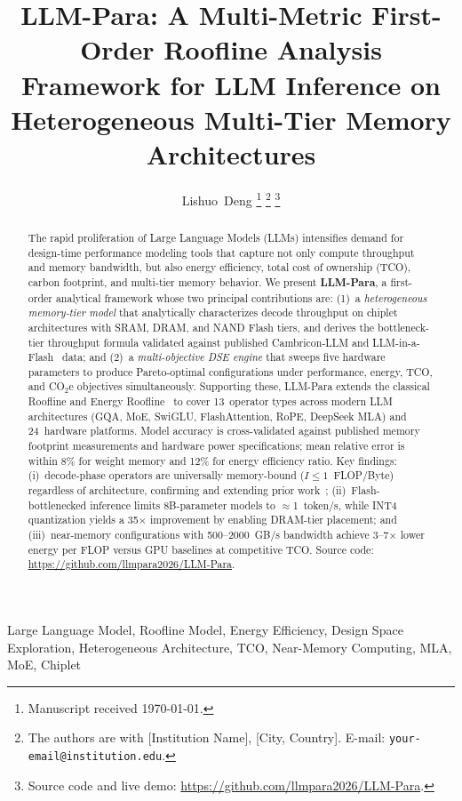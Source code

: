 \documentclass[journal]{IEEEtran}
\title{LLM-Para: A Multi-Metric First-Order Roofline Analysis Framework
       for LLM Inference on Heterogeneous Multi-Tier Memory Architectures}
\author{%
  Lishuo~Deng%
  \thanks{Manuscript received \today.}%
  \thanks{The authors are with [Institution Name], [City, Country].
          E-mail: \texttt{your-email@institution.edu}.}%
  \thanks{Source code and live demo:
          \url{https://github.com/llmpara2026/LLM-Para}.}%
}
\begin{document}
\maketitle

\begin{abstract}
The rapid proliferation of Large Language Models (LLMs) intensifies demand
for design-time performance modeling tools that capture not only compute
throughput and memory bandwidth, but also energy efficiency, total cost of
ownership (TCO), carbon footprint, and multi-tier memory behavior.
We present \textbf{LLM-Para}, a first-order analytical framework whose two
principal contributions are: (1)~a \emph{heterogeneous memory-tier model}
that analytically characterizes decode throughput on chiplet architectures
with SRAM, DRAM, and NAND Flash tiers, and derives the bottleneck-tier
throughput formula validated against published Cambricon-LLM and
LLM-in-a-Flash~\cite{llminaflash} data; and (2)~a \emph{multi-objective DSE engine} that sweeps
five hardware parameters to produce Pareto-optimal configurations under
performance, energy, TCO, and CO$_2$e objectives simultaneously.
Supporting these, LLM-Para extends the classical Roofline and Energy
Roofline~\cite{energyroofline} to cover 13~operator types across modern
LLM architectures (GQA, MoE, SwiGLU, FlashAttention, RoPE, DeepSeek MLA)
and 24~hardware platforms.
Model accuracy is cross-validated against published memory footprint
measurements and hardware power specifications; mean relative error is
within 8\% for weight memory and 12\% for energy efficiency ratio.
Key findings: (i)~decode-phase operators are universally memory-bound
($I\!\leq\!1$~FLOP/Byte) regardless of architecture, confirming and
extending prior work~\cite{llmviewer}; (ii)~Flash-bottlenecked inference
limits 8B-parameter models to $\approx$1~token/s, while INT4 quantization
yields a 35$\times$ improvement by enabling DRAM-tier placement; and
(iii)~near-memory configurations with 500--2000~GB/s bandwidth achieve
3--7$\times$ lower energy per FLOP versus GPU baselines at competitive TCO.
Source code: \url{https://github.com/llmpara2026/LLM-Para}.
\end{abstract}

\begin{IEEEkeywords}
Large Language Model, Roofline Model, Energy Efficiency,
Design Space Exploration, Heterogeneous Architecture,
TCO, Near-Memory Computing, MLA, MoE, Chiplet
\end{IEEEkeywords}

\end{document}
